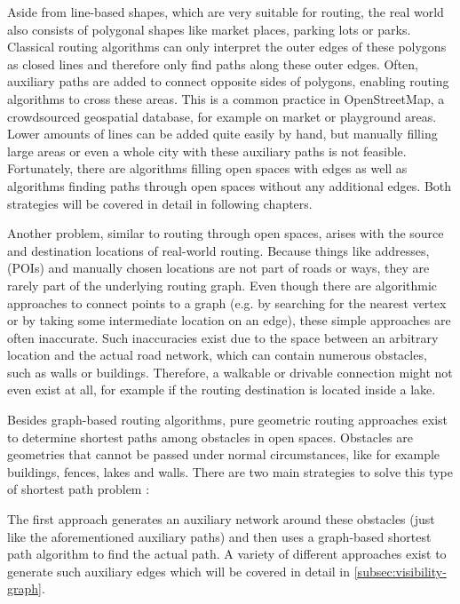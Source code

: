 	Aside from line-based shapes, which are very suitable for routing, the real world also consists of polygonal shapes like market places, parking lots or parks.
	Classical routing algorithms can only interpret the outer edges of these polygons as closed lines and therefore only find paths along these outer edges.
	Often, auxiliary paths are added to connect opposite sides of polygons, enabling routing algorithms to cross these areas.
	This is a common practice in OpenStreetMap, a crowdsourced geospatial database, for example on market or playground areas.
	Lower amounts of lines can be added quite easily by hand, but manually filling large areas or even a whole city with these auxiliary paths is not feasible.
	Fortunately, there are algorithms filling open spaces with edges as well as algorithms finding paths through open spaces without any additional edges.
	Both strategies will be covered in detail in following chapters.
	
	Another problem, similar to routing through open spaces, arises with the source and destination locations of real-world routing.
	Because things like addresses,  (POIs) and manually chosen locations are not part of roads or ways, they are rarely part of the underlying routing graph.
	Even though there are algorithmic approaches to connect points to a graph (e.g. by searching for the nearest vertex or by taking some intermediate location on an edge), these simple approaches are often inaccurate.
	Such inaccuracies exist due to the space between an arbitrary location and the actual road network, which can contain numerous obstacles, such as walls or buildings.
	Therefore, a walkable or drivable connection might not even exist at all, for example if the routing destination is located inside a lake.
	
	Besides graph-based routing algorithms, pure geometric routing approaches exist to determine shortest paths among obstacles in open spaces.
	Obstacles are geometries that cannot be passed under normal circumstances, like for example buildings, fences, lakes and walls.
	There are two main strategies to solve this type of shortest path problem \cite{hershberger-suri}:
	
	The first approach generates an auxiliary network around these obstacles (just like the aforementioned auxiliary paths) and then uses a graph-based shortest path algorithm to find the actual path.
	A variety of different approaches exist to generate such auxiliary edges\cite{graser-osm-open-spaces} which will be covered in detail in \cref{subsec:visibility-graph}.
	
